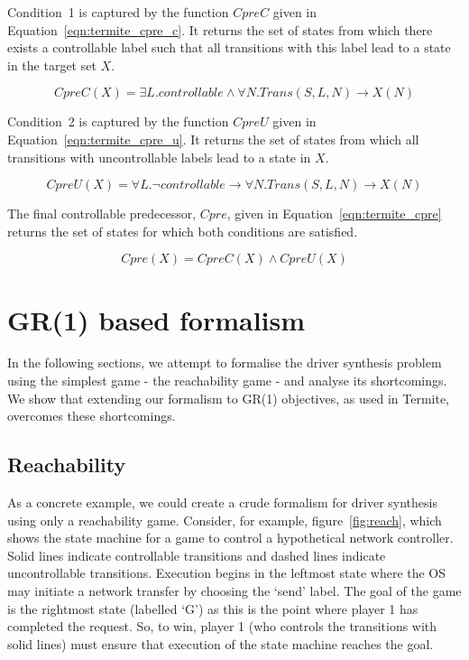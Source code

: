 Condition~1 is captured by the function $CpreC$ given in Equation~\ref{eqn:termite_cpre_c}. It returns the set of states from which there exists a controllable label such that all transitions with this label lead to a state in the target set $X$.

\begin{equation}
    CpreC(X) =  \exists L. controllable \land \forall N. Trans(S, L, N) \rightarrow X(N)
    \label{eqn:termite_cpre_c}
\end{equation}

Condition~2 is captured by the function $CpreU$ given in Equation~\ref{eqn:termite_cpre_u}. It returns the set of states from which all transitions with uncontrollable labels lead to a state in $X$.

\begin{equation}
    CpreU(X) =  \forall L. \neg controllable \rightarrow \forall N. Trans(S, L, N) \rightarrow X(N)
    \label{eqn:termite_cpre_u}
\end{equation}

The final controllable predecessor, $Cpre$, given in Equation~\ref{eqn:termite_cpre} returns the set of states for which both conditions are satisfied.

\begin{equation}
    Cpre(X) =  CpreC(X) \land CpreU(X)
    \label{eqn:termite_cpre}
\end{equation}

\section{GR(1) based formalism}

In the following sections, we attempt to formalise the driver synthesis problem using the simplest game - the reachability game - and analyse its shortcomings. We show that extending our formalism to GR(1) objectives, as used in Termite, overcomes these shortcomings.

\subsection{Reachability}

As a concrete example, we could create a crude formalism for driver synthesis using only a reachability game. Consider, for example, figure~\ref{fig:reach}, which shows the state machine for a game to control a hypothetical network controller. Solid lines indicate controllable transitions and dashed lines indicate uncontrollable transitions. Execution begins in the leftmost state where the OS may initiate a network transfer by choosing the `send' label. The goal of the game is the rightmost state (labelled `G') as this is the point where player 1 has completed the request. So, to win, player 1 (who controls the transitions with solid lines) must ensure that execution of the state machine reaches the goal. 

